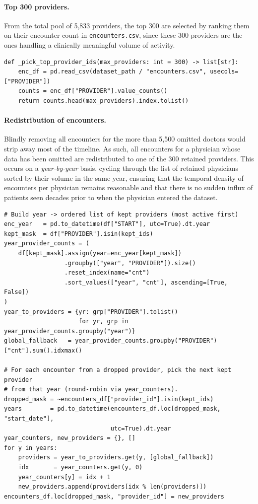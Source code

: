 \paragraph{Top 300 providers.} From the total pool of 5,833 providers, the top 300 are selected by ranking them on their encounter count in \texttt{encounters.csv}, since these 300 providers are the ones handling a clinically meaningful volume of activity.

\begin{lstlisting}[style=pythonstyle]
def _pick_top_provider_ids(max_providers: int = 300) -> list[str]:
    enc_df = pd.read_csv(dataset_path / "encounters.csv", usecols=["PROVIDER"])
    counts = enc_df["PROVIDER"].value_counts()
    return counts.head(max_providers).index.tolist()
\end{lstlisting}

\paragraph{Redistribution of encounters.} Blindly removing all encounters for the more than 5,500 omitted doctors would strip away most of the timeline. As such, all encounters for a physician whose data has been omitted are redistributed to one of the 300 retained providers. This occurs on a \emph{year-by-year} basis, cycling through the list of retained physicians sorted by their volume in the same year, ensuring that the temporal density of encounters per physician remains reasonable and that there is no sudden influx of patients seen decades prior to when the physician entered the dataset.

\begin{lstlisting}[style=pythonstyle]
# Build year -> ordered list of kept providers (most active first)
enc_year   = pd.to_datetime(df["START"], utc=True).dt.year
kept_mask  = df["PROVIDER"].isin(kept_ids)
year_provider_counts = (
    df[kept_mask].assign(year=enc_year[kept_mask])
                 .groupby(["year", "PROVIDER"]).size()
                 .reset_index(name="cnt")
                 .sort_values(["year", "cnt"], ascending=[True, False])
)
year_to_providers = {yr: grp["PROVIDER"].tolist()
                     for yr, grp in year_provider_counts.groupby("year")}
global_fallback   = year_provider_counts.groupby("PROVIDER")["cnt"].sum().idxmax()

# For each encounter from a dropped provider, pick the next kept provider
# from that year (round-robin via year_counters).
dropped_mask = ~encounters_df["provider_id"].isin(kept_ids)
years        = pd.to_datetime(encounters_df.loc[dropped_mask, "start_date"],
                              utc=True).dt.year
year_counters, new_providers = {}, []
for y in years:
    providers = year_to_providers.get(y, [global_fallback])
    idx       = year_counters.get(y, 0)
    year_counters[y] = idx + 1
    new_providers.append(providers[idx % len(providers)])
encounters_df.loc[dropped_mask, "provider_id"] = new_providers
\end{lstlisting}

